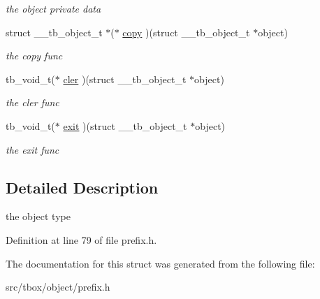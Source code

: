 \begin{DoxyCompactItemize}
\begin{DoxyCompactList}\small\item\em the object private data \end{DoxyCompactList}\item 
\hypertarget{structtb__object__t_ac4e533c4a812e10edc56dc0e89ec45cf}{struct \-\_\-\-\_\-tb\-\_\-object\-\_\-t $\ast$($\ast$ \hyperlink{structtb__object__t_ac4e533c4a812e10edc56dc0e89ec45cf}{copy} )(struct \-\_\-\-\_\-tb\-\_\-object\-\_\-t $\ast$object)}\label{structtb__object__t_ac4e533c4a812e10edc56dc0e89ec45cf}

\begin{DoxyCompactList}\small\item\em the copy func \end{DoxyCompactList}\item 
\hypertarget{structtb__object__t_adb610970c018cb834d275c2972787191}{tb\-\_\-void\-\_\-t($\ast$ \hyperlink{structtb__object__t_adb610970c018cb834d275c2972787191}{cler} )(struct \-\_\-\-\_\-tb\-\_\-object\-\_\-t $\ast$object)}\label{structtb__object__t_adb610970c018cb834d275c2972787191}

\begin{DoxyCompactList}\small\item\em the cler func \end{DoxyCompactList}\item 
\hypertarget{structtb__object__t_aaf9a2ec708b7e9e2f02c977ea61e3f5c}{tb\-\_\-void\-\_\-t($\ast$ \hyperlink{structtb__object__t_aaf9a2ec708b7e9e2f02c977ea61e3f5c}{exit} )(struct \-\_\-\-\_\-tb\-\_\-object\-\_\-t $\ast$object)}\label{structtb__object__t_aaf9a2ec708b7e9e2f02c977ea61e3f5c}

\begin{DoxyCompactList}\small\item\em the exit func \end{DoxyCompactList}\end{DoxyCompactItemize}


\subsection{Detailed Description}
the object type 

Definition at line 79 of file prefix.\-h.



The documentation for this struct was generated from the following file\-:\begin{DoxyCompactItemize}
\item 
src/tbox/object/prefix.\-h\end{DoxyCompactItemize}
